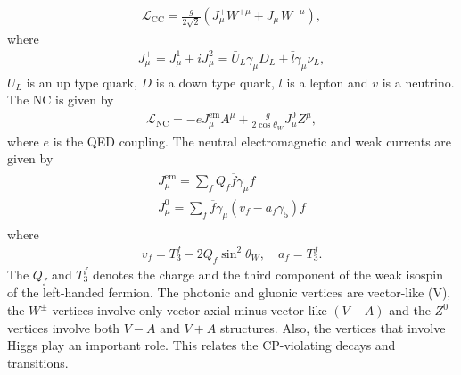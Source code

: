 \begin{eqnarray}
\mathcal{L}_{\mathrm{CC}}=\frac{g}{2 \sqrt{2}}\left(J_{\mu}^{+} W^{+\mu}+J_{\mu}^{-} W^{-\mu}\right),
\end{eqnarray}
where 
\begin{eqnarray}
J_{\mu}^{+}=J^1_{\mu}+iJ^2_{\mu}=\bar{U}_L\gamma_{\mu}D_L+\bar{l}\gamma_{\mu}\nu_{L},
\end{eqnarray}
$U_L$ is an up type quark, $D$ is a down type quark, $l$ is a lepton and $v$ is a neutrino.
The NC is given by
\begin{eqnarray}
\mathcal{L}_{\mathrm{NC}}=-e J_{\mu}^{\mathrm{em}} A^{\mu}+\frac{g}{2 \cos \theta_W} J_{\mu}^{0} Z^{\mu},
\end{eqnarray}
where $e$ is the QED coupling. The neutral electromagnetic and weak currents are given by
\begin{eqnarray}
\begin{array}{c}{J_{\mu}^{\mathrm{em}}=\sum_{f} Q_{f} \overline{f} \gamma_{\mu} f} \\ {J_{\mu}^{0}=\sum_{f} \overline{f} \gamma_{\mu}\left(v_{f}-a_{f} \gamma_{5}\right) f}\end{array}
\end{eqnarray}
where 
\begin{eqnarray}
v_{f}=T_{3}^{f}-2 Q_{f} \sin ^{2} \theta_W, \quad a_{f}=T_{3}^{f}.
\end{eqnarray}
The $Q_f$ and $T_3^f$ denotes the charge and the third component of the weak isospin of the left-handed fermion. The photonic and gluonic vertices are vector-like (V), the $W^{\pm}$ vertices involve only vector-axial minus vector-like $(V-A)$ and the $Z^0$ vertices involve both $V-A$ and $V+A$ structures. Also, the vertices that involve Higgs play an important role. This relates the CP-violating decays and transitions. 

